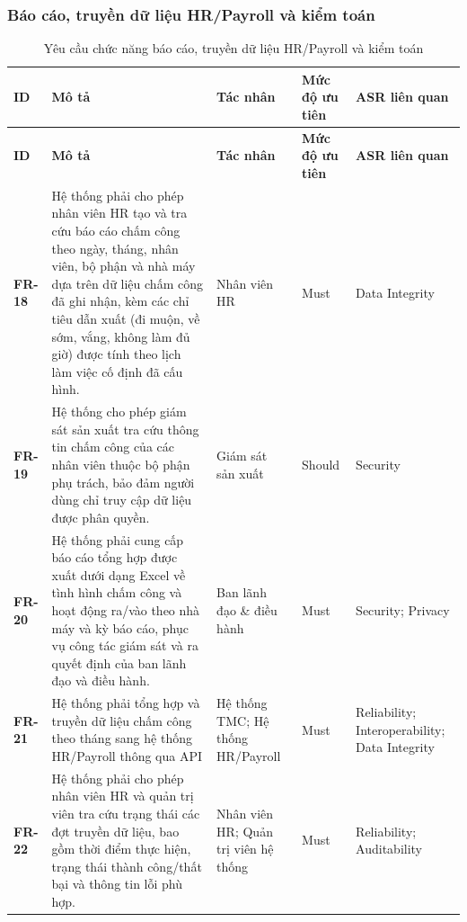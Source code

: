 \subsubsection{Báo cáo, truyền dữ liệu HR/Payroll và kiểm toán}

\begingroup
\small
\renewcommand{\arraystretch}{1.2}
\begin{longtable}{|>{\centering\arraybackslash}m{1.3cm}|>{\raggedright\arraybackslash}m{6.2cm}|>{\raggedright\arraybackslash}m{2.4cm}|>{\centering\arraybackslash}m{1.5cm}|>{\raggedright\arraybackslash}m{3.5cm}|}
    \caption{Yêu cầu chức năng báo cáo, truyền dữ liệu HR/Payroll và kiểm toán}\label{tab:functional-requirements-reporting-audit}\\
    \hline
    \textbf{ID} & \textbf{Mô tả} & \textbf{Tác nhân} & \textbf{Mức độ ưu tiên} & \textbf{ASR liên quan}\\
    \hline
    \endfirsthead
    \hline
    \textbf{ID} & \textbf{Mô tả} & \textbf{Tác nhân} & \textbf{Mức độ ưu tiên} & \textbf{ASR liên quan}\\
    \hline
    \endhead
    \hline
    \endfoot
    \hline
    \endlastfoot
    \textbf{FR-18} & Hệ thống phải cho phép nhân viên HR tạo và tra cứu báo cáo chấm công theo ngày, tháng, nhân viên, bộ phận và nhà máy dựa trên dữ liệu chấm công đã ghi nhận, kèm các chỉ tiêu dẫn xuất (đi muộn, về sớm, vắng, không làm đủ giờ) được tính theo lịch làm việc cố định đã cấu hình. & Nhân viên HR & Must & Data Integrity\\
    \hline
    \textbf{FR-19} & Hệ thống cho phép giám sát sản xuất tra cứu thông tin chấm công của các nhân viên thuộc bộ phận phụ trách, bảo đảm người dùng chỉ truy cập dữ liệu được phân quyền. & Giám sát sản xuất & Should & Security\\
    \hline
    \textbf{FR-20} & Hệ thống phải cung cấp báo cáo tổng hợp được xuất dưới dạng Excel về tình hình chấm công và hoạt động ra/vào theo nhà máy và kỳ báo cáo, phục vụ công tác giám sát và ra quyết định của ban lãnh đạo và điều hành. & Ban lãnh đạo \& điều hành & Must & Security; Privacy\\
    \hline
    \textbf{FR-21} & Hệ thống phải tổng hợp và truyền dữ liệu chấm công theo tháng sang hệ thống HR/Payroll thông qua API & Hệ thống TMC; Hệ thống HR/Payroll & Must & Reliability; Interoperability; Data Integrity\\
    \hline
    \textbf{FR-22} & Hệ thống phải cho phép nhân viên HR và quản trị viên tra cứu trạng thái các đợt truyền dữ liệu, bao gồm thời điểm thực hiện, trạng thái thành công/thất bại và thông tin lỗi phù hợp. & Nhân viên HR; Quản trị viên hệ thống & Must & Reliability; Auditability\\

\end{longtable}
